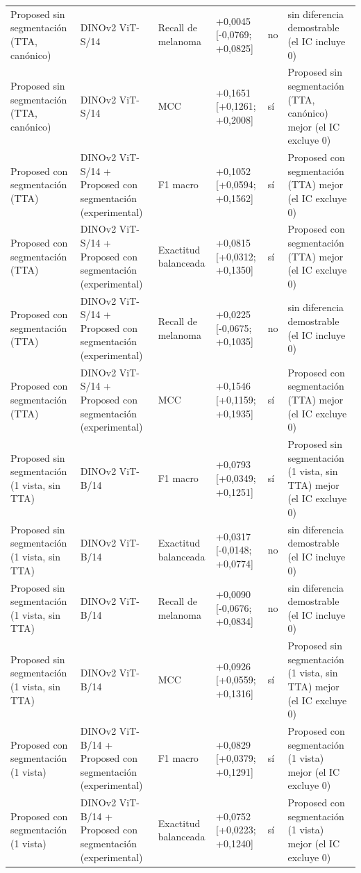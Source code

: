 \begin{longtable}{@{}llllll@{}}
Proposed sin segmentación (TTA, canónico) & DINOv2 ViT-S/14 & Recall de melanoma & +0,0045 [-0,0769; +0,0825] & no & sin diferencia demostrable (el IC incluye 0) \\
Proposed sin segmentación (TTA, canónico) & DINOv2 ViT-S/14 & MCC & +0,1651 [+0,1261; +0,2008] & sí & Proposed sin segmentación (TTA, canónico) mejor (el IC excluye 0) \\
Proposed con segmentación (TTA) & DINOv2 ViT-S/14 + Proposed con segmentación (experimental) & F1 macro & +0,1052 [+0,0594; +0,1562] & sí & Proposed con segmentación (TTA) mejor (el IC excluye 0) \\
Proposed con segmentación (TTA) & DINOv2 ViT-S/14 + Proposed con segmentación (experimental) & Exactitud balanceada & +0,0815 [+0,0312; +0,1350] & sí & Proposed con segmentación (TTA) mejor (el IC excluye 0) \\
Proposed con segmentación (TTA) & DINOv2 ViT-S/14 + Proposed con segmentación (experimental) & Recall de melanoma & +0,0225 [-0,0675; +0,1035] & no & sin diferencia demostrable (el IC incluye 0) \\
Proposed con segmentación (TTA) & DINOv2 ViT-S/14 + Proposed con segmentación (experimental) & MCC & +0,1546 [+0,1159; +0,1935] & sí & Proposed con segmentación (TTA) mejor (el IC excluye 0) \\
Proposed sin segmentación (1 vista, sin TTA) & DINOv2 ViT-B/14 & F1 macro & +0,0793 [+0,0349; +0,1251] & sí & Proposed sin segmentación (1 vista, sin TTA) mejor (el IC excluye 0) \\
Proposed sin segmentación (1 vista, sin TTA) & DINOv2 ViT-B/14 & Exactitud balanceada & +0,0317 [-0,0148; +0,0774] & no & sin diferencia demostrable (el IC incluye 0) \\
Proposed sin segmentación (1 vista, sin TTA) & DINOv2 ViT-B/14 & Recall de melanoma & +0,0090 [-0,0676; +0,0834] & no & sin diferencia demostrable (el IC incluye 0) \\
Proposed sin segmentación (1 vista, sin TTA) & DINOv2 ViT-B/14 & MCC & +0,0926 [+0,0559; +0,1316] & sí & Proposed sin segmentación (1 vista, sin TTA) mejor (el IC excluye 0) \\
Proposed con segmentación (1 vista) & DINOv2 ViT-B/14 + Proposed con segmentación (experimental) & F1 macro & +0,0829 [+0,0379; +0,1291] & sí & Proposed con segmentación (1 vista) mejor (el IC excluye 0) \\
Proposed con segmentación (1 vista) & DINOv2 ViT-B/14 + Proposed con segmentación (experimental) & Exactitud balanceada & +0,0752 [+0,0223; +0,1240] & sí & Proposed con segmentación (1 vista) mejor (el IC excluye 0) \\

\end{longtable}
